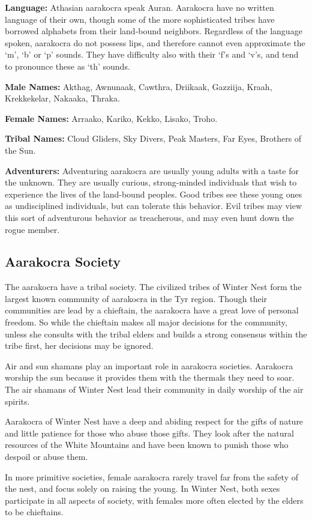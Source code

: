 \textbf{Language:} Athasian aarakocra speak Auran. Aarakocra have no written language of their own, though some of the more sophisticated tribes have borrowed alphabets from their land-bound neighbors. Regardless of the language spoken, aarakocra do not possess lips, and therefore cannot even approximate the ‘m', ‘b' or ‘p' sounds. They have difficulty also with their ‘f's and ‘v's, and tend to pronounce these as ‘th' sounds.

\textbf{Male Names:} Akthag, Awnunaak, Cawthra, Driikaak, Gazziija, Kraah, Krekkekelar, Nakaaka, Thraka.

\textbf{Female Names:} Arraako, Kariko, Kekko, Lisako, Troho.

\textbf{Tribal Names:} Cloud Gliders, Sky Divers, Peak Masters, Far Eyes, Brothers of the Sun.

\textbf{Adventurers:} Adventuring aarakocra are usually young adults with a taste for the unknown. They are usually curious, strong-minded individuals that wish to experience the lives of the land-bound peoples. Good tribes see these young ones as undisciplined individuals, but can tolerate this behavior. Evil tribes may view this sort of adventurous behavior as treacherous, and may even hunt down the rogue member.

\subsection{Aarakocra Society}
The aarakocra have a tribal society. The civilized tribes of Winter Nest form the largest known community of aarakocra in the Tyr region. Though their communities are lead by a chieftain, the aarakocra have a great love of personal freedom. So while the chieftain makes all major decisions for the community, unless she consults with the tribal elders and builds a strong consensus within the tribe first, her decisions may be ignored.

Air and sun shamans play an important role in aarakocra societies. Aarakocra worship the sun because it provides them with the thermals they need to soar. The air shamans of Winter Nest lead their community in daily worship of the air spirits.

Aarakocra of Winter Nest have a deep and abiding respect for the gifts of nature and little patience for those who abuse those gifts. They look after the natural resources of the White Mountains and have been known to punish those who despoil or abuse them.

In more primitive societies, female aarakocra rarely travel far from the safety of the nest, and focus solely on raising the young. In Winter Nest, both sexes participate in all aspects of society, with females more often elected by the elders to be chieftains.


